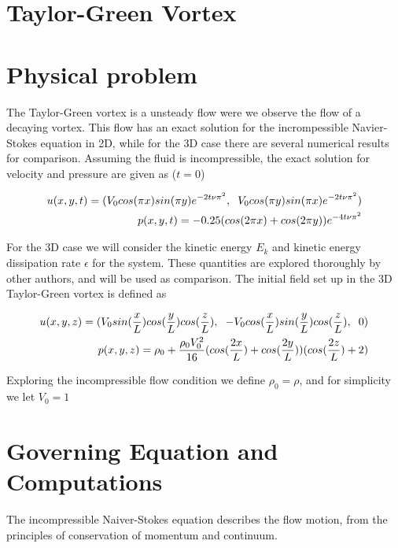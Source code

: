 \documentclass[a4paper,norsk]{article}
\begin{document}
\maketitle
\section*{Taylor-Green Vortex}


\section*{Physical problem}
The Taylor-Green vortex is a unsteady flow were we observe the flow of a decaying
vortex. This flow has an exact solution for the incrompessible Navier-Stokes equation in 2D, while for the 3D
case there are several numerical results for comparison.
Assuming the fluid is incompressible, the exact solution for velocity and pressure are given as ($t=0$)

\begin{align}
u(x,y,t) = (V_{0} cos(\pi x)sin(\pi y) e^{-2 t \nu \pi^{2} }, \hspace{2mm} V_{0}cos(\pi y)sin(\pi x) e^{-2 t \nu \pi^2} ) \\
p(x,y,t) = -0.25(cos(2\pi x) + cos(2 \pi y) ) e^{-4 t \nu \pi^2}
\end{align}


For the 3D case we will consider the kinetic energy $E_k$ and kinetic energy dissipation rate $\epsilon$  for the system. These quantities are
explored thoroughly by other authors, and will be used as comparison. The initial field set up in the 3D Taylor-Green vortex is defined as

\begin{align}
u(x,y,z) = ( V_{0}sin(\frac{x}{L}) cos(\frac{y}{L}) cos(\frac{z}{L}), \hspace{2mm}-V_{0}cos(\frac{x}{L})sin(\frac{y}{L})cos(\frac{z}{L}), \hspace{2mm} 0 )\\
p(x,y,z) = \rho_{0} + \frac{\rho_0 V_0^2}{16}(cos(\frac{2x}{L}) + cos(\frac{2y}{L}))(cos(\frac{2z}{L}) + 2)
\end{align}

Exploring the incompressible flow condition we define $\rho_0 = \rho$, and for simplicity we let $V_0 = 1$

\section*{Governing Equation and Computations}
The incompressible Naiver-Stokes equation describes the flow motion, from the principles of conservation of momentum
and continuum.
\end{document}
